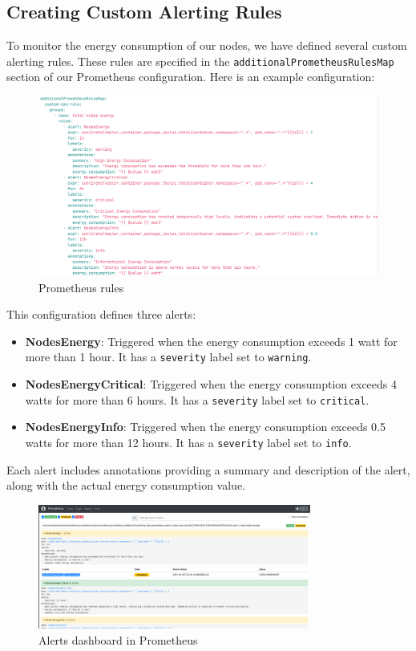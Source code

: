 \subsection{Creating Custom Alerting Rules}

To monitor the energy consumption of our nodes, we have defined several custom alerting rules. These rules are specified in the \texttt{additionalPrometheusRulesMap} section of our Prometheus configuration. Here is an example configuration:

\begin{figure}[H]
    \centering
    \includegraphics[width=16cm]{Figures/prometheus-rule.png}
    \caption{Prometheus rules}
\end{figure}

This configuration defines three alerts:

\begin{itemize}
  \item \textbf{NodesEnergy}: Triggered when the energy consumption exceeds 1 watt for more than 1 hour. It has a \texttt{severity} label set to \texttt{warning}.
  \item \textbf{NodesEnergyCritical}: Triggered when the energy consumption exceeds 4 watts for more than 6 hours. It has a \texttt{severity} label set to \texttt{critical}.
  \item \textbf{NodesEnergyInfo}: Triggered when the energy consumption exceeds 0.5 watts for more than 12 hours. It has a \texttt{severity} label set to \texttt{info}.
\end{itemize}

Each alert includes annotations providing a summary and description of the alert, along with the actual energy consumption value.

\begin{figure}[H]
  \centering
  \includegraphics[width=0.8\textwidth]{Figures/alerts.png}
  \caption{Alerts dashboard in Prometheus}
\end{figure}


